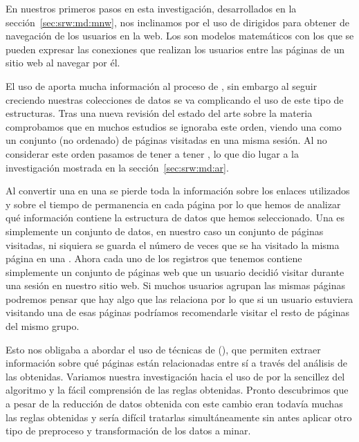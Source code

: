 En nuestros primeros pasos en esta investigación, desarrollados en la sección~\ref{sec:srw:md:mnw}, nos inclinamos por el uso de \grafos dirigidos para obtener \patrones de navegación de los usuarios en la web. Los \grafos son modelos matemáticos con los que se pueden expresar las conexiones que realizan los usuarios entre las páginas de un sitio web al navegar por él.

El uso de \grafos aporta mucha información al proceso de \WUM, sin embargo al seguir creciendo nuestras colecciones de datos se va complicando el uso de este tipo de estructuras. Tras una nueva revisión del estado del arte sobre la materia comprobamos que en muchos estudios se ignoraba este orden, viendo una \sn como un conjunto (no ordenado) de páginas visitadas en una misma sesión. Al no considerar este orden pasamos de tener \secuencias a tener \transacciones, lo que dio lugar a la investigación mostrada en la sección~\ref{sec:srw:md:ar}.

Al convertir una \sn en una \transaccion se pierde toda la información sobre los enlaces utilizados y sobre el tiempo de permanencia en cada página por lo que hemos de analizar qué información contiene la estructura de datos que hemos seleccionado. Una \transaccion es simplemente un conjunto de datos, en nuestro caso un conjunto de páginas visitadas, ni siquiera se guarda el número de veces que se ha visitado la misma página en una \sn. Ahora cada uno de los registros que tenemos contiene simplemente un conjunto de páginas web que un usuario decidió visitar durante una sesión en nuestro sitio web. Si muchos usuarios agrupan las mismas páginas podremos pensar que hay algo que las relaciona por lo que si un usuario estuviera visitando una de esas páginas podríamos recomendarle visitar el resto de páginas del mismo grupo.

Esto nos obligaba a abordar el uso de técnicas de \arm (\ARM), que permiten extraer información sobre qué páginas están relacionadas entre sí a través del análisis de las \transacciones obtenidas. Variamos nuestra investigación hacia el uso de \ARM por la sencillez del algoritmo \apriori y la fácil comprensión de las reglas obtenidas. Pronto descubrimos que a pesar de la reducción de datos obtenida con este cambio eran todavía muchas las reglas obtenidas y sería difícil tratarlas simultáneamente sin antes aplicar otro tipo de preproceso y transformación de los datos a minar.
